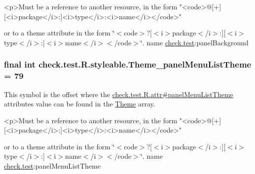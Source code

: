 \begin{DoxyVerb}      <p>Must be a reference to another resource, in the form "<code>@[+][<i>package</i>:]<i>type</i>:<i>name</i></code>"
\end{DoxyVerb}
 or to a theme attribute in the form \char`\"{}$<$code$>$?\mbox{[}$<$i$>$package$<$/i$>$\+:\mbox{]}\mbox{[}$<$i$>$type$<$/i$>$\+:\mbox{]}$<$i$>$name$<$/i$>$$<$/code$>$\char`\"{}.  name \hyperlink{namespacecheck_1_1test}{check.\+test}\+:panel\+Background \hypertarget{classcheck_1_1test_1_1_r_1_1styleable_a1d6dd9a183e0165672173da100f35f74}{}
\subsubsection[{Theme\+\_\+panel\+Menu\+List\+Theme}]{\setlength{\rightskip}{0pt plus 5cm}final int check.\+test.\+R.\+styleable.\+Theme\+\_\+panel\+Menu\+List\+Theme = 79\hspace{0.3cm}{\ttfamily [static]}}\label{classcheck_1_1test_1_1_r_1_1styleable_a1d6dd9a183e0165672173da100f35f74}
This symbol is the offset where the \hyperlink{classcheck_1_1test_1_1_r_1_1attr_a6f31f89058cb2734f29f1bb7913c05db}{check.\+test.\+R.\+attr\#panel\+Menu\+List\+Theme} attribute\textquotesingle{}s value can be found in the \hyperlink{classcheck_1_1test_1_1_r_1_1styleable_acca726d02016a0cf607782ec3a436a81}{Theme} array.

\begin{DoxyVerb}      <p>Must be a reference to another resource, in the form "<code>@[+][<i>package</i>:]<i>type</i>:<i>name</i></code>"
\end{DoxyVerb}
 or to a theme attribute in the form \char`\"{}$<$code$>$?\mbox{[}$<$i$>$package$<$/i$>$\+:\mbox{]}\mbox{[}$<$i$>$type$<$/i$>$\+:\mbox{]}$<$i$>$name$<$/i$>$$<$/code$>$\char`\"{}.  name \hyperlink{namespacecheck_1_1test}{check.\+test}\+:panel\+Menu\+List\+Theme \hypertarget{classcheck_1_1test_1_1_r_1_1styleable_ac3385a441e77f588205019797ec7c36f}{}
